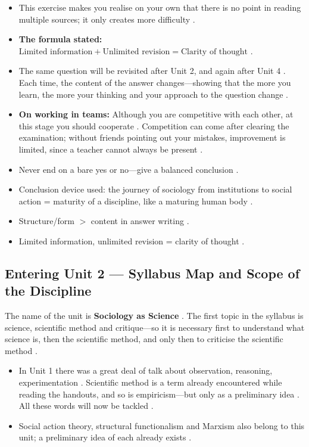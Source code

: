 \begin{CriticalPoint}
\begin{itemize}
    \item This exercise makes you realise on your own that there is no point in reading multiple sources; it only creates more difficulty .
    \item \textbf{The formula stated:} $\text{Limited information} + \text{Unlimited revision} = \text{Clarity of thought}$ .
    \item The same question will be revisited after Unit 2, and again after Unit 4 . Each time, the content of the answer changes---showing that the more you learn, the more your thinking and your approach to the question change .
    \item \textbf{On working in teams:} Although you are competitive with each other, at this stage you should cooperate . Competition can come after clearing the examination; without friends pointing out your mistakes, improvement is limited, since a teacher cannot always be present .
\end{itemize}
\end{CriticalPoint}

\begin{QuickRevision}
\begin{itemize}
    \item Never end on a bare yes or no---give a balanced conclusion .
    \item Conclusion device used: the journey of sociology from institutions to social action = maturity of a discipline, like a maturing human body .
    \item Structure/form $>$ content in answer writing .
    \item Limited information, unlimited revision = clarity of thought .
\end{itemize}
\end{QuickRevision}

\subsection{Entering Unit 2 --- Syllabus Map and Scope of the Discipline}
The name of the unit is \textbf{Sociology as Science} . The first topic in the syllabus is science, scientific method and critique---so it is necessary first to understand what science is, then the scientific method, and only then to criticise the scientific method .
\begin{itemize}
    \item In Unit 1 there was a great deal of talk about observation, reasoning, experimentation . Scientific method is a term already encountered while reading the handouts, and so is empiricism---but only as a preliminary idea . All these words will now be tackled .
    \item Social action theory, structural functionalism and Marxism also belong to this unit; a preliminary idea of each already exists .
\end{itemize}


